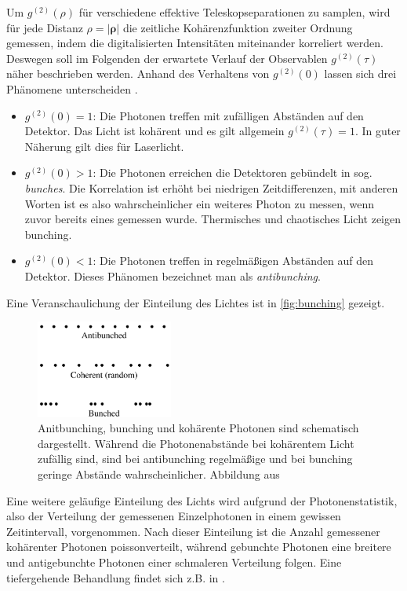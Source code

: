 Um $g^{(2)}(\rho)$ für verschiedene effektive Teleskopseparationen zu samplen, wird für jede Distanz $\rho=|\bm{\rho}|$ die zeitliche Kohärenzfunktion zweiter Ordnung gemessen, indem die digitalisierten Intensitäten miteinander korreliert werden. 
Deswegen soll im Folgenden der erwartete Verlauf der Observablen $g^{(2)}(\tau)$ näher beschrieben werden. 
Anhand des Verhaltens von $g^{(2)}(0)$ lassen sich drei Phänomene unterscheiden \cite{foxQuantumOpticsIntroduction2006}. 
\begin{itemize}
    \item $g^{(2)}(0)=1$: Die Photonen treffen mit zufälligen Abständen auf den Detektor. Das Licht ist kohärent und es gilt allgemein $g^{(2)}(\tau)=1$. In guter Näherung gilt dies für Laserlicht.
    \item $g^{(2)}(0)>1$: Die Photonen erreichen die Detektoren gebündelt in sog. \emph{bunches}. Die Korrelation ist erhöht bei niedrigen Zeitdifferenzen, mit anderen Worten ist es also wahrscheinlicher ein weiteres Photon zu messen, wenn zuvor bereits eines gemessen wurde. Thermisches und chaotisches Licht zeigen bunching.
    \item $g^{(2)}(0)<1$: Die Photonen treffen in regelmäßigen Abständen auf den Detektor. Dieses Phänomen bezeichnet man als \emph{antibunching}. 
\end{itemize}
Eine Veranschaulichung der Einteilung des Lichtes ist in \autoref{fig:bunching} gezeigt. 
\begin{figure}[htbp]
    \centering
    \includegraphics[width=0.4\textwidth]{images/Theorie/Fox_6.6.png}
    \caption{Anitbunching, bunching und kohärente Photonen sind schematisch dargestellt. Während die Photonenabstände bei kohärentem Licht zufällig sind, sind bei antibunching regelmäßige und bei bunching geringe Abstände wahrscheinlicher. Abbildung aus \cite[Fig. 6.6]{foxQuantumOpticsIntroduction2006}}
    \label{fig:bunching}
\end{figure}
Eine weitere geläufige Einteilung des Lichts wird aufgrund der Photonenstatistik, also der Verteilung der gemessenen Einzelphotonen in einem gewissen Zeitintervall, vorgenommen. 
Nach dieser Einteilung ist die Anzahl gemessener kohärenter Photonen poissonverteilt, während gebunchte Photonen eine breitere und antigebunchte Photonen einer schmaleren Verteilung folgen. 
Eine tiefergehende Behandlung findet sich z.B. in \cite[Kap. 5.4-5.6]{foxQuantumOpticsIntroduction2006}. \\

